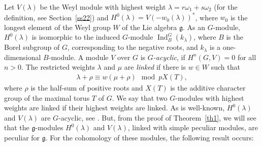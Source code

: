 \documentclass[pdftex]{sigma}%
\numberwithin{equation}{section}
\begin{document}
Let $V(\lambda)$ be the Weyl module with highest weight $\lambda=r\omega_1+s\omega_2$ (for the definition, see Section~\ref{ss22}) and $H^0(\lambda)=V(-w_0(\lambda))^*$, where $w_0$ is the longest element of the Weyl group $W$ of the Lie algebra $\mathfrak{g}$. As an $G$-module, $H^0(\lambda)$ is isomorphic to the induced $G$-module $\operatorname{Ind}_B^{G}(k_{\lambda})$, where $B$ is the Borel subgroup of $G$, corresponding to the negative roots, and $k_{\lambda}$ is a one-dimensional $B$-module. A module $V$ over $G$ is {\it $G$-acyclic}, if $H^n(G,V)=0$ for all $n>0$. The restricted weights $\lambda$ and $\mu$ are {\it linked} if there is $w\in W$ such that
\begin{gather*}
\lambda+\rho\equiv w(\mu+\rho)\mod pX(T),
\end{gather*}
where $\rho$ is the half-sum of positive roots and $X(T)$ is the additive character group of the maximal torus $T$ of $G$. We say that two $G$-modules with highest weights are linked if their highest weights are linked.
As is well-known, $H^0(\lambda)$ and $V(\lambda)$ are $G$-acyclic, see \cite[Corollary~3.4]{CPSK77}. But, from the proof of Theorem~\ref{th1}, we will see that the $\mathfrak{g}$-modules $H^0(\lambda)$ and $V(\lambda)$, linked with simple peculiar modules, are peculiar for $\mathfrak{g}$. For the cohomology of these modules, the following result occurs:
\end{document}
